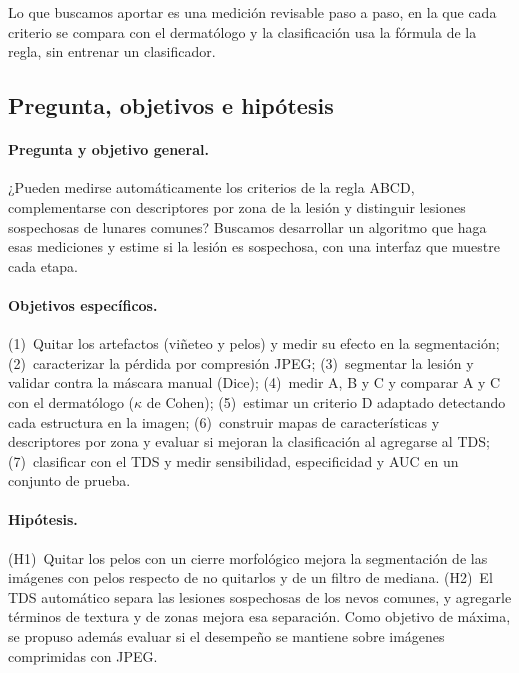Lo que buscamos aportar es una medición revisable paso a paso, en la que cada criterio se compara con el dermatólogo y la clasificación usa la fórmula de la regla, sin entrenar un clasificador.

\subsection{Pregunta, objetivos e hipótesis}
\label{sec:objetivos}

\paragraph{Pregunta y objetivo general.} ¿Pueden medirse automáticamente los criterios de la regla ABCD, complementarse con descriptores por zona de la lesión y distinguir lesiones sospechosas de lunares comunes? Buscamos desarrollar un algoritmo que haga esas mediciones y estime si la lesión es sospechosa, con una interfaz que muestre cada etapa.

\paragraph{Objetivos específicos.}
(1)~Quitar los artefactos (viñeteo y pelos) y medir su efecto en la segmentación;
(2)~caracterizar la pérdida por compresión JPEG;
(3)~segmentar la lesión y validar contra la máscara manual (Dice);
(4)~medir A, B y C y comparar A y C con el dermatólogo ($\kappa$ de Cohen);
(5)~estimar un criterio D adaptado detectando cada estructura en la imagen;
(6)~construir mapas de características y descriptores por zona y evaluar si mejoran la clasificación al agregarse al TDS;
(7)~clasificar con el TDS y medir sensibilidad, especificidad y AUC en un conjunto de prueba.

\paragraph{Hipótesis.}
(H1)~Quitar los pelos con un cierre morfológico mejora la segmentación de las imágenes con pelos respecto de no quitarlos y de un filtro de mediana.
(H2)~El TDS automático separa las lesiones sospechosas de los nevos comunes, y agregarle términos de textura y de zonas mejora esa separación.
Como objetivo de máxima, se propuso además evaluar si el desempeño se mantiene sobre imágenes comprimidas con JPEG.
